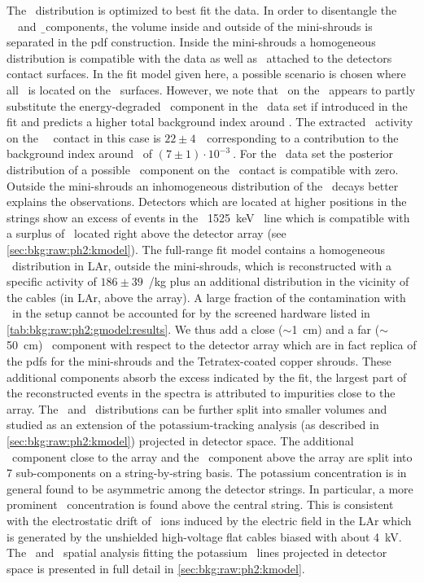 The \kvz\ distribution is optimized to best fit the data. In order to disentangle the
\kvz\ \g\  and \b\ components, the volume inside and outside of the mini-shrouds is
separated in the pdf construction. Inside the mini-shrouds a homogeneous distribution is
compatible with the data as well as \kvz\ attached to the detectors contact surfaces. In
the fit model given here, a possible scenario is chosen where all \kvz\ is located on the
\nplus\ surfaces. However, we note that \kvz\ on the \pplus\ appears to partly substitute
the energy-degraded \a\ component in the \enrCoaxII\ data set if introduced in the fit and
predicts a higher total background index around \qbb. The extracted \kvz\ activity on the
\scoax\ \pplus\ contact in this case is $22\pm4$~\mubq\ corresponding to a
contribution to the background index around \qbb\ of $(7\pm1)\cdot10^{-3}~$\ctsper. For the \enrBEGeII\
data set the posterior distribution of a possible \kvz\ component on the \pplus\ contact
is compatible with zero. Outside the mini-shrouds an inhomogeneous distribution of the
\kvz\ decays better explains the observations. Detectors which are located at higher
positions in the strings show an excess of events in the \kvz\ 1525~keV \g\ line which is
compatible with a surplus of \kvz\ located right above the detector array (see
\cref{sec:bkg:raw:ph2:kmodel}). The full-range fit model contains a homogeneous \kvz\
distribution in LAr, outside the mini-shrouds, which is reconstructed with a specific
activity of $186\pm39$~\mubq/kg plus an additional distribution in the vicinity of the
cables (in LAr, above the array).
\newpar
A large fraction of the contamination with \kvn\ in the setup cannot be accounted for by
the screened hardware listed in \cref{tab:bkg:raw:ph2:gmodel:results}. We thus add a close
($\sim$1~cm) and a far ($\sim$50~cm) \kvn\ component with respect to the detector array
which are in fact replica of the pdfs for the mini-shrouds and the Tetratex\reg-coated copper
shrouds. These additional components absorb the excess indicated by the fit, the largest
part of the reconstructed events in the spectra is attributed to impurities close to the
array.
\newpar
The \kvn\ and \kvz\ distributions can be further split into smaller volumes and studied as
an extension of the potassium-tracking analysis (as described in
\cref{sec:bkg:raw:ph2:kmodel}) projected in detector space. The additional \kvn\ component
close to the array and the \kvz\ component above the array are split into 7 sub-components
on a string-by-string basis. The potassium concentration is in general found to be
asymmetric among the detector strings. In particular, a more prominent \kvz\ concentration
is found above the central string. This is consistent with the electrostatic drift of
\kvz\ ions induced by the electric field in the LAr which is generated by the unshielded
high-voltage flat cables biased with about 4~kV. The \kvn\ and \kvz\ spatial analysis
fitting the potassium \g\ lines projected in detector space is presented in full detail in
\cref{sec:bkg:raw:ph2:kmodel}.

